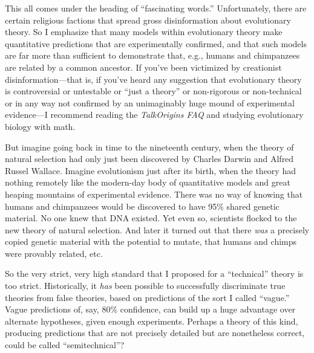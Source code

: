 {
 This all comes under the heading of ``fascinating
words.'' Unfortunately, there are certain religious
factions that spread gross disinformation about evolutionary theory. So
I emphasize that many models within evolutionary theory make
quantitative predictions that are experimentally confirmed, and that
such models are far more than sufficient to demonstrate that, e.g.,
humans and chimpanzees are related by a common ancestor. If
you've been victimized by creationist
disinformation---that is, if you've heard any
suggestion that evolutionary theory is controversial or untestable or
``just a theory'' or non-rigorous or
non-technical or in any way not confirmed by an unimaginably huge mound
of experimental evidence---I recommend reading the \textit{TalkOrigins
FAQ} and studying evolutionary biology with math.}

{
 But imagine going back in time to the nineteenth century, when the
theory of natural selection had only just been discovered by Charles
Darwin and Alfred Russel Wallace. Imagine evolutionism just after its
birth, when the theory had nothing remotely like the modern-day body of
quantitative models and great heaping mountains of experimental
evidence. There was no way of knowing that humans and chimpanzees would
be discovered to have 95\% shared genetic material. No one knew that
DNA existed. Yet even so, scientists flocked to the new theory of
natural selection. And later it turned out that there \textit{was} a
precisely copied genetic material with the potential to mutate, that
humans and chimps were provably related, etc.}

{
 So the very strict, very high standard that I proposed for a
``technical'' theory is too strict.
Historically, it \textit{has} been possible to successfully
discriminate true theories from false theories, based on predictions of
the sort I called ``vague.'' Vague
predictions of, say, 80\% confidence, can build up a huge advantage
over alternate hypotheses, given enough experiments. Perhaps a theory
of this kind, producing predictions that are not precisely detailed but
are nonetheless correct, could be called
``semitechnical''?}

